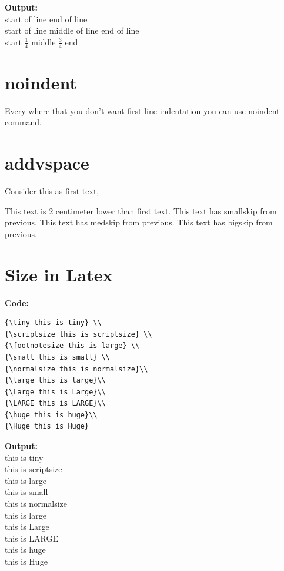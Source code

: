 \documentclass{book}
\newcommand{\myc}{\noindent\textbf{{\color{blue} Code}:}}
\newcommand{\myo}{\noindent\textbf{{\color{blue} Output}:\\}}
\begin{document}
\myo
start of line \hfill end of line \\
start of line \hfill middle of line \hfill end of line\\
start \hfill $\frac{1}{4}$ \hfill middle \hfill $\frac{3}{4}$ \hfill end

\section{noindent}
\noindent
Every where that you don't want first line indentation you can use noindent command.

\section{addvspace}
Consider this as first text,

\addvspace{2cm}
\noindent
This text is 2 centimeter lower than first text.
\smallskip
\noindent
This text has smallskip from previous.
\medskip
\noindent
This text has medskip from previous.
\bigskip
\noindent
This text has bigskip from previous.

\section{Size in Latex}
\myc
\begin{lstlisting}
{\tiny this is tiny} \\
{\scriptsize this is scriptsize} \\
{\footnotesize this is large} \\
{\small this is small} \\
{\normalsize this is normalsize}\\
{\large this is large}\\
{\Large this is Large}\\
{\LARGE this is LARGE}\\
{\huge this is huge}\\
{\Huge this is Huge}
\end{lstlisting}

\myo
{\tiny this is tiny} \\
{\scriptsize this is scriptsize} \\
{\footnotesize this is large} \\
{\small this is small} \\
{\normalsize this is normalsize}\\
{\large this is large}\\
{\Large this is Large}\\
{\LARGE this is LARGE}\\
{\huge this is huge}\\
{\Huge this is Huge}
\end{document}
